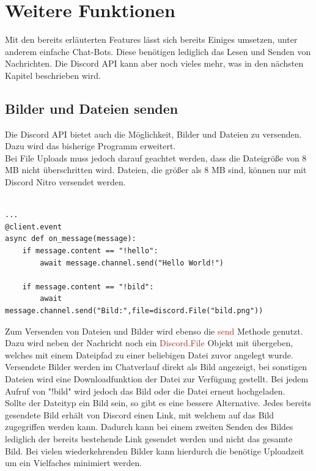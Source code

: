 \documentclass[sigplan,screen]{acmart}
\begin{document}
\section{Weitere Funktionen}

Mit den bereits erläuterten Features lässt sich bereits Einiges umsetzen, unter anderem einfache Chat-Bots. Diese benötigen lediglich das Lesen und Senden von Nachrichten. Die Discord API kann aber noch vieles mehr, was in den nächsten Kapitel beschrieben wird.

\subsection{Bilder und Dateien senden}

Die Discord API bietet auch die Möglichkeit, Bilder und Dateien zu versenden. Dazu wird das bisherige Programm erweitert. \\
\noindent Bei File Uploads muss jedoch darauf geachtet werden, dass die Dateigröße von 8 MB nicht überschritten wird. Dateien, die größer als 8 MB sind, können nur mit Discord Nitro versendet werden. \cite{dis1}

\begin{lstlisting}

...
@client.event
async def on_message(message):
    if message.content == "!hello":
        await message.channel.send("Hello World!")

    if message.content == "!bild":
        await message.channel.send("Bild:",file=discord.File("bild.png"))    

\end{lstlisting} 
Zum Versenden von Dateien und Bilder wird ebenso die \textcolor{brown}{send} Methode genutzt. Dazu wird neben der Nachricht noch ein \textcolor{brown}{Discord.File} Objekt mit übergeben, welches mit einem Dateipfad zu einer beliebigen Datei zuvor angelegt wurde. \\  
\noindent Versendete Bilder werden im Chatverlauf direkt als Bild angezeigt, bei sonstigen Dateien wird eine Downloadfunktion der Datei zur Verfügung gestellt. Bei jedem Aufruf von "!bild" wird jedoch das Bild oder die Datei erneut hochgeladen. \\
\noindent Sollte der Dateityp ein Bild sein, so gibt es eine bessere Alternative. Jedes bereits gesendete Bild erhält von Discord einen Link, mit welchem auf das Bild zugegriffen werden kann. Dadurch kann bei einem zweiten Senden des Bildes lediglich der bereits bestehende Link gesendet werden und nicht das gesamte Bild. Bei vielen wiederkehrenden Bilder kann hierdurch die benötige Uploadzeit um ein Vielfaches minimiert werden. 
\end{document}
